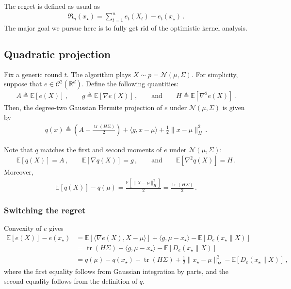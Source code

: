\documentclass{article}
\theoremstyle{plain}
\theoremstyle{definition}
\theoremstyle{plain}
\newcommand{\tr}{\operatorname{tr}}
\newcommand{\Rd}{\mathbb{R}^d}
\newcommand{\Reg}{\mathfrak{R}}
\newcommand{\E}{\mathbb E}
\newcommand{\cN}{\mathcal N}
\newcommand{\cC}{\mathcal C}
\begin{document}
The regret is defined as usual as
\begin{align}
    \Reg_n(x_\star) = \sum_{t=1}^n e_t(X_t) - e_t(x_\star)\,.
\end{align}
The major goal we pursue here is to fully get rid of the optimistic kernel analysis.

\subsection{Quadratic projection}
Fix a generic round $t$.
The algorithm plays $X \sim p = \cN(\mu, \Sigma)$.
For simplicity, suppose that $e \in \cC^2(\Rd)$.
Define the following quantities:
\begin{align}
    A \triangleq \E[e(X)]\,, \qquad
    g \triangleq \E\left[\nabla e(X)\right]\,, \qquad\text{and}\qquad
    H \triangleq \E\left[\nabla^2 e(X)\right]\,.
\end{align}
Then, the degree-two Gaussian Hermite projection of $e$ under $\cN(\mu, \Sigma)$ is given by
\begin{align}
    q(x) \triangleq \left(A - \frac{\tr(H\Sigma)}{2}\right) + \langle g, x-\mu\rangle + \frac{1}{2}\|x-\mu\|^2_{H}\,.
\end{align}

Note that $q$ matches the first and second moments of $e$ under $\cN(\mu, \Sigma)$:
\begin{align}
    \E[q(X)]           = A\,, \qquad
    \E[\nabla q(X)]    = g\,, \qquad\text{and}\qquad
    \E[\nabla^2 q(X)]  = H\,.
\end{align}
Moreover,
\begin{align}
    \E[q(X)] - q(\mu) = \frac{\E[\|X-\mu\|^2_H]}{2} = \frac{\tr(H\Sigma)}{2}\,.
\end{align}

\subsubsection{Switching the regret}
Convexity of $e$ gives
\begin{align}
    \E[e(X)] - e(x_\star)
     & =
    \E\left[\langle \nabla e(X), X - \mu\rangle\right] + \langle g, \mu - x_\star\rangle
    - \E[D_e(x_\star \| X)]
    \\
     & =
    \tr(H\Sigma) + \langle g, \mu - x_\star\rangle - \E[D_e(x_\star \| X)]
    \\
     & =
    q(\mu) - q(x_\star) + \tr(H\Sigma) + \frac12 \|x_\star - \mu\|^2_H - \E[D_e(x_\star \| X)]
    \,,
    \label{eq:quadratic_regret_switch}
\end{align}
where the first equality follows from Gaussian integration by parts,
and the second equality follows from the definition of $q$.
\end{document}
